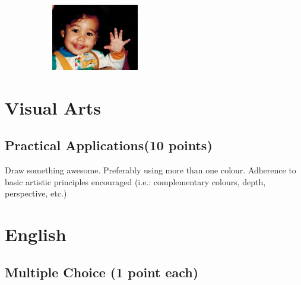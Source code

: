 \documentclass[11pt]{exam}
\begin{document}
\begin{questions}
\begin{figure}[h]
\begin{subfigure}[b]{0.3\textwidth}
        \caption{\underline{\hspace{2cm}}} 
        \label{fig:snake}
    \end{subfigure}
    \begin{subfigure}[b]{0.3\textwidth}
        \includegraphics[width=\textwidth]{cute6}
        \caption{\underline{\hspace{2cm}}} 
        \label{fig:baby}
    \end{subfigure}  
\end{figure}
 


\newpage
\section{Visual Arts}
\subsection{Practical Applications(10 points)}
\setcounter{question}{0}
\question Draw something awesome. Preferably using more than one colour. Adherence to basic artistic principles encouraged (i.e.: complementary colours, depth, perspective, etc.)
\vfill

\newpage
\section{English}
\subsection{Multiple Choice (1 point each)}


\end{questions}
\end{document}
